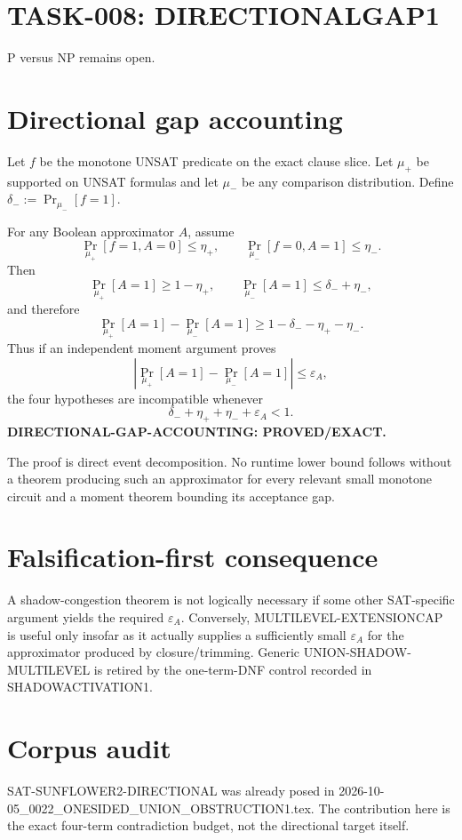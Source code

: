 \documentclass{article}
\begin{document}
\section*{TASK-008: DIRECTIONALGAP1}
P versus NP remains open.

\section*{Directional gap accounting}
Let $f$ be the monotone UNSAT predicate on the exact clause slice. Let
$\mu_+$ be supported on UNSAT formulas and let $\mu_-$ be any comparison
distribution. Define $\delta_-:=\Pr_{\mu_-}[f=1]$.

For any Boolean approximator $A$, assume
\[
\Pr_{\mu_+}[f=1,A=0]\le\eta_+,
\qquad
\Pr_{\mu_-}[f=0,A=1]\le\eta_-.
\]
Then
\[
\Pr_{\mu_+}[A=1]\ge1-\eta_+,
\qquad
\Pr_{\mu_-}[A=1]\le\delta_-+\eta_-,
\]
and therefore
\[
\boxed{
\Pr_{\mu_+}[A=1]-\Pr_{\mu_-}[A=1]
\ge1-\delta_--\eta_+-\eta_-.
}
\]
Thus if an independent moment argument proves
\[
\left|\Pr_{\mu_+}[A=1]-\Pr_{\mu_-}[A=1]\right|\le\varepsilon_A,
\]
the four hypotheses are incompatible whenever
\[
\boxed{\delta_-+\eta_++\eta_-+\varepsilon_A<1.}
\]
\textbf{DIRECTIONAL-GAP-ACCOUNTING: PROVED/EXACT.}

The proof is direct event decomposition. No runtime lower bound follows
without a theorem producing such an approximator for every relevant
small monotone circuit and a moment theorem bounding its acceptance gap.

\section*{Falsification-first consequence}
A shadow-congestion theorem is not logically necessary if some other
SAT-specific argument yields the required $\varepsilon_A$. Conversely,
MULTILEVEL-EXTENSIONCAP is useful only insofar as it actually supplies
a sufficiently small $\varepsilon_A$ for the approximator produced by
closure/trimming. Generic UNION-SHADOW-MULTILEVEL is retired by the
one-term-DNF control recorded in SHADOWACTIVATION1.

\section*{Corpus audit}
SAT-SUNFLOWER2-DIRECTIONAL was already posed in
2026-10-05_0022_ONESIDED_UNION_OBSTRUCTION1.tex. The contribution here
is the exact four-term contradiction budget, not the directional target
itself.
\end{document}
